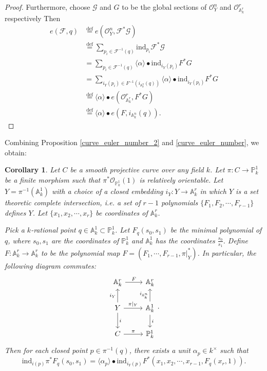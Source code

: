 \documentclass[12pt, reqno]{amsart}
\newtheorem{corollary}[theorem]{Corollary}
\theoremstyle{definition}
\newcommand{\A}{\mathbb{A}} %
\newcommand{\Proj}{\mathbb{P}} %
\newcommand{\Oh}{\mathscr{O}} %
\newcommand{\ind}{\mathrm{ind}} %
\begin{document}
\begin{proof}
Furthermore, choose $\mathcal{G}$ and $G$ to be the global sections of $\Oh^n_Y$ and $\Oh^r_{\A^r_k}$ 
respectively Then
\begin{align*}
    e(\mathcal{F}, q) 
    &\overset{\mathrm{def}}{=} e(\Oh^n_Y, \mathcal{F}^* \mathcal{G}) \\
    &\overset{\mathrm{def}}{=} \sum_{p_i \in \mathcal{F}^{-1}(q)} \ind_{p_i} \mathcal{F}^* \mathcal{G} \\
    &= \sum_{p_i \in \mathcal{F}^{-1}(q)} \langle \alpha \rangle \bullet \ind_{i_Y(p_i)} F^* G \\
    &=  \sum_{i_Y(p_i) \in F^{-1}(i_{\A^n_k}(q))} \langle \alpha \rangle \bullet \ind_{i_Y(p_i)} F^* G \\
    &\overset{\mathrm{def}}{=} \langle \alpha \rangle \bullet e(\Oh^r_{\A^r_k}, F^* G) \\
    &\overset{\mathrm{def}}{=} \langle \alpha \rangle \bullet e(F, i_{\A^n_k}(q)).
\end{align*}

\end{proof}



Combining Proposition \ref{curve_euler_number_2} and \ref{curve_euler_number}, we obtain:
\begin{corollary} \label{cor:curve_euler_number}
    Let $C$ be a smooth projective curve over any field $k$. Let $\pi: C \to \Proj^1_k$ be a finite morphism such that $\pi^* \Oh_{\Proj^1_k}(1)$ is relatively orientable. Let $Y = \pi^{-1}(\A^1_k)$ with a choice of a closed embedding $i_Y: Y \to \A^r_k$ in which $Y$ is a set theoretic complete intersection, i.e. a set of $r-1$ polynomials $\{F_1, F_2, \cdots, F_{r-1}\}$ defines $Y$. Let $\{x_1,x_2,\cdots,x_r\}$ be coordinates of $\A^r_k$.
    
    Pick a $k$-rational point $q \in \A^1_k \subset \Proj^1_k$. Let $F_q(s_0,s_1)$ be the minimal polynomial of $q$, where $s_0,s_1$ are the coordinates of $\Proj^1_k$ and $\A^1_k$ has the coordinates $\frac{s_0}{s_1}$. Define $F: \A^r_k \to \A^r_k$ to be the polynomial map $F = (F_1, \cdots, F_{r-1}, \pi|_Y^*)$. In particular, the following diagram commutes:
    \begin{equation*}
        \begin{tikzcd}
                    \A^r_k \arrow[r, "F"] & \A^r_k \\
        Y \arrow[r, "\pi|_Y"] \arrow[u, "i_Y"] \arrow[d, "i"] & \A^1_k \arrow[u, "i_{\A^n_k}"] \arrow[d, "i"] \\
        C \arrow[r, "\pi"] & \Proj^1_k
        \end{tikzcd}.
    \end{equation*}
    Then for each closed point $p \in \pi^{-1}(q)$, there exists a unit $\alpha_p \in k^\times$ such that
    \begin{equation*}
        \ind_{i(p)} \pi^* F_q(s_0,s_1) = \langle \alpha_p \rangle \bullet \ind_{i_Y(p)} F^* (x_1,x_2,\cdots,x_{r-1},F_q(x_r,1)).
    \end{equation*}
\end{corollary}
\end{document}
